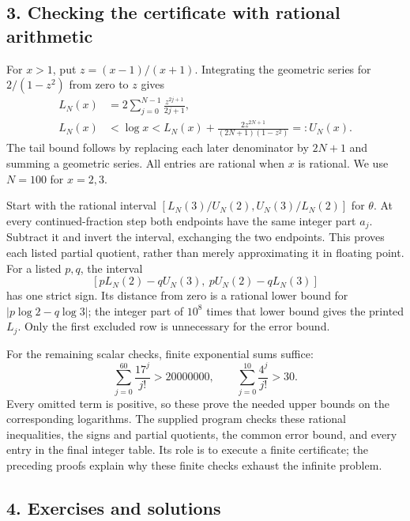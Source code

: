 \documentclass[
  11pt,
  a4paper,
]{article}
\begin{document}
\subsection{3. Checking the certificate with rational
arithmetic}\label{checking-the-certificate-with-rational-arithmetic}

For \(x>1\), put \(z=(x-1)/(x+1)\). Integrating the geometric series for
\(2/(1-z^2)\) from zero to \(z\) gives \[
\begin{aligned}
L_N(x)&=2\sum_{j=0}^{N-1}\frac{z^{2j+1}}{2j+1},\\
L_N(x)&<\log x<L_N(x)
+\frac{2z^{2N+1}}{(2N+1)(1-z^2)}=:U_N(x).
\end{aligned}
\tag{11.13}
\] The tail bound follows by replacing each later denominator by
\(2N+1\) and summing a geometric series. All entries are rational when
\(x\) is rational. We use \(N=100\) for \(x=2,3\).

Start with the rational interval \([L_N(3)/U_N(2),U_N(3)/L_N(2)]\) for
\(\theta\). At every continued-fraction step both endpoints have the
same integer part \(a_j\). Subtract it and invert the interval,
exchanging the two endpoints. This proves each listed partial quotient,
rather than merely approximating it in floating point. For a listed
\(p,q\), the interval \[
[pL_N(2)-qU_N(3),\ pU_N(2)-qL_N(3)]
\tag{11.14}
\] has one strict sign. Its distance from zero is a rational lower bound
for \(|p\log2-q\log3|\); the integer part of \(10^8\) times that lower
bound gives the printed \(L_j\). Only the first excluded row is
unnecessary for the error bound.

For the remaining scalar checks, finite exponential sums suffice: \[
\sum_{j=0}^{60}\frac{17^j}{j!}>20000000,\qquad
\sum_{j=0}^{10}\frac{4^j}{j!}>30.
\] Every omitted term is positive, so these prove the needed upper
bounds on the corresponding logarithms. The supplied program checks
these rational inequalities, the signs and partial quotients, the common
error bound, and every entry in the final integer table. Its role is to
execute a finite certificate; the preceding proofs explain why these
finite checks exhaust the infinite problem.

\subsection{4. Exercises and solutions}\label{exercises-and-solutions}
\end{document}
